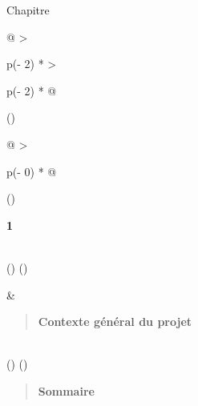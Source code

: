\documentclass[
]{article}
\begin{document}
Chapitre

\begin{longtable}[]{@{}
  >{\raggedright\arraybackslash}p{(\columnwidth - 2\tabcolsep) * }
  >{\raggedright\arraybackslash}p{(\columnwidth - 2\tabcolsep) * }@{}}
\toprule()
\begin{minipage}[b]{\linewidth}\raggedright
\begin{longtable}[]{@{}
  >{\raggedright\arraybackslash}p{(\columnwidth - 0\tabcolsep) * }@{}}
\toprule()
\begin{minipage}[b]{\linewidth}\raggedright
\textbf{1}
\end{minipage} \\
\midrule()
\endhead
\bottomrule()
\end{longtable}
\end{minipage} & \begin{minipage}[b]{\linewidth}\raggedright
\begin{quote}
\textbf{Contexte général du projet}
\end{quote}
\end{minipage} \\
\midrule()
\endhead
\bottomrule()
\end{longtable}

\begin{quote}
\textbf{Sommaire}
\end{quote}
\end{document}
